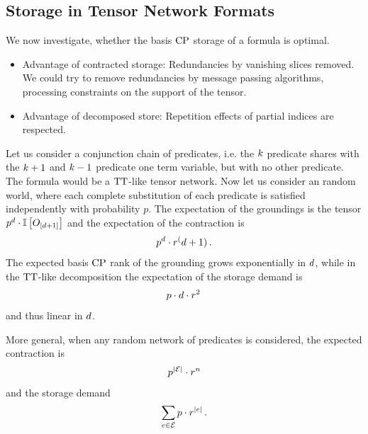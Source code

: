 \subsection{Storage in Tensor Network Formats}

We now investigate, whether the basis $\mathrm{CP}$ storage of a formula is optimal.
\begin{itemize}
    \item Advantage of contracted storage: Redundancies by vanishing slices removed.
    We could try to remove redundancies by message passing algorithms, processing constraints on the support of the tensor.
    \item Advantage of decomposed store: Repetition effects of partial indices are respected.
\end{itemize}


\begin{example}

    Let us consider a conjunction chain of predicates, i.e. the $k$ predicate shares with the $k+1$ and $k-1$ predicate one term variable, but with no other predicate.
    The formula would be a $\mathrm{TT}$-like tensor network.
    Now let us consider an random world, where each complete substitution of each predicate is satisfied independently with probability $p$.
    The expectation of the groundings is the tensor $p^{d} \cdot \mathbb{I}\left[O_{[d+1]}\right]$ and the expectation of the contraction is
    \begin{align*}
        p^{d} \cdot r^(d+1) \, .
    \end{align*}
    The expected basis $\mathrm{CP}$ rank of the grounding grows exponentially in $d$, while in the $\mathrm{TT}$-like decomposition the expectation of the storage demand is
    \begin{align*}
        p \cdot d \cdot r^2 \,
    \end{align*}
    and thus linear in $d$.

    More general, when any random network of predicates is considered, the expected contraction is
    \begin{align*}
        p^{\left|\mathcal{E}\right|} \cdot r^{n}
    \end{align*}
    and the storage demand
    \begin{align*}
        \sum_{e\in\mathcal{E}} p \cdot r^{\left|e\right|} \, .
    \end{align*}

\end{example}


